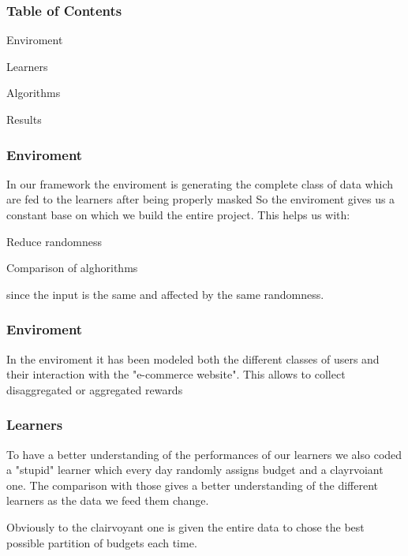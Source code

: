\documentclass{beamer}
\begin{document}
\frame{\titlepage}


\begin{frame}
    \frametitle{Table of Contents}
    \begin{list}{*}{\setlength{\itemsep}{1cm}}
        \item<1-> Enviroment 
        \item<2-> Learners
        \item<3-> Algorithms
        \item<4-> Results
    \end{list}
    
\end{frame}


\begin {frame}
\frametitle{Enviroment }
In our framework the enviroment is generating the complete class of data which are fed to the learners after being properly masked
So the enviroment gives us a constant base on which we build the entire project. This helps us with:
 
\begin{list}{-}{\setlength{\itemsep}{0.5cm}}
        \item<1-> Reduce randomness
        \item<2-> Comparison of alghorithms    
    \end{list}
    since the input is the same and affected by the same randomness.
\end {frame}

\begin {frame}
\frametitle{Enviroment }
In the enviroment it has been modeled both the different classes of users and their interaction with the "e-commerce website".
This allows to collect disaggregated or aggregated rewards
\end{frame}

\begin {frame}
\frametitle{Learners}
To have a better understanding of the performances of our learners we also coded a "stupid" learner which every day randomly assigns budget and a clayrvoiant one.
The comparison with those gives a better understanding of the different learners as the data we feed them change.
\begin{exampleblock}{Obviously to the clairvoyant one is given the entire data to chose the best possible partition of budgets each time.}
    \end{exampleblock}
    
\end{frame}
\end{document}
